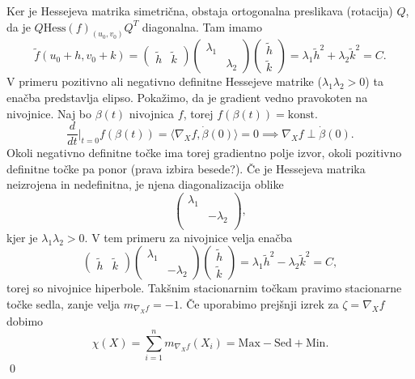 Ker je Hessejeva matrika simetrična, obstaja ortogonalna preslikava (rotacija) $Q$, da je $Q\text{Hess}(f)_{(u_0,v_0)}Q^{T}$ diagonalna. Tam imamo \begin{equation*}
\tilde{f}(u_0 +h, v_0 + k) = \begin{pmatrix}
    \tilde{h} & \tilde{k} 
  \end{pmatrix}
  \begin{pmatrix}
    \lambda_1 &  \\
     & \lambda_2
  \end{pmatrix}  
  \begin{pmatrix}
    \tilde{h} \\
    \tilde{k} 
  \end{pmatrix} = \lambda_1 \tilde{h}^2 + \lambda_2 \tilde{k}^2 = C. 
\end{equation*}  
V primeru pozitivno ali negativno definitne Hessejeve matrike ($\lambda_1 \lambda_2  > 0$) ta enačba predstavlja elipso. Pokažimo, da je gradient vedno pravokoten na nivojnice. Naj bo $\beta(t)$ nivojnica $f$, torej $f(\beta(t)) = \text{konst.}$\begin{equation*}
\frac{d}{dt} \bigg|_{t = 0} f(\beta(t)) = \langle \nabla_X f, \dot{\beta}(0) \rangle  = 0 \implies \nabla_X f \perp \dot{\beta}(0).
\end{equation*}  
Okoli negativno definitne točke ima torej gradientno polje izvor, okoli pozitivno definitne točke pa ponor (prava izbira besede?). Če je Hessejeva matrika neizrojena in nedefinitna, je njena diagonalizacija oblike \begin{equation*}
\begin{pmatrix}
    \lambda_1 & \\
     & -\lambda_2\\
\end{pmatrix},
\end{equation*}kjer je $\lambda_1 \lambda_2 > 0$. V tem primeru za nivojnice velja enačba \begin{equation*}
    \begin{pmatrix}
        \tilde{h} & \tilde{k} 
      \end{pmatrix}
      \begin{pmatrix}
        \lambda_1 &  \\
         & -\lambda_2
      \end{pmatrix}
      \begin{pmatrix}
        \tilde{h} \\
        \tilde{k} 
      \end{pmatrix} = \lambda_1 \tilde{h}^2 - \lambda_2 \tilde{k}^2 = C,
\end{equation*}  
torej so nivojnice hiperbole. Takšnim stacionarnim točkam pravimo stacionarne točke sedla, zanje velja $m_{\nabla_X f} = -1$. Če uporabimo prejšnji izrek za $\zeta = \nabla_X f$ dobimo \begin{equation*}
\chi(X) = \sum_{i = 1}^{n} m_{\nabla_X f}(X_i) = \text{Max} - \text{Sed} + \text{Min}.
\end{equation*}  
\qed